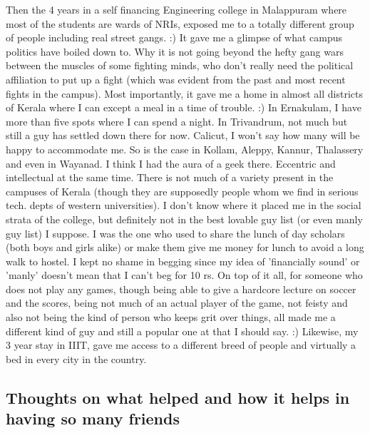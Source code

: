 Then the 4 years in a self financing Engineering college in Malappuram where most of the students 
are wards of NRIs, exposed me to a totally different group of people including real street gangs. :) 
It gave me a glimpse of what campus politics have boiled down to. Why it is not going beyond the hefty 
gang wars between the muscles of some fighting minds, who don't really need the political affiliation 
to put up a fight (which was evident from the past and most recent fights in the campus). Most importantly, 
it gave me a home in almost all districts of Kerala where I can except a meal in a time of trouble. :) 
In Ernakulam, I have more than five spots where I can spend a night. In Trivandrum, not much but still 
a guy has settled down there for now. Calicut, I won't say how many will be happy to accommodate me. So is the case in Kollam, Aleppy, Kannur, Thalassery and even in Wayanad. I think I had the aura of a geek there.
Eccentric and intellectual at the same time. There is not much of a variety present in the campuses of Kerala
(though they are supposedly people whom we find in serious tech. depts of western universities). I
don't know where it placed me in the social strata of the college, but definitely not in the best lovable guy 
list (or even manly guy list) I suppose. I was the one who used to share the lunch of day
scholars (both boys and girls alike) or make them give me money for lunch to avoid a long walk to
hostel. I kept no shame in begging since my idea of 'financially sound' or 'manly' doesn't mean that I can't 
beg for 10 rs. On top of it all, for someone who does not play any games, though being able to give a hardcore lecture on soccer 
and the scores, being not much of an actual player of the game, not feisty and also not being the kind of person who keeps grit 
over things, all made me a different kind of guy and still a popular one at that I should say. :) Likewise, 
my 3 year stay in IIIT, gave me access to a different breed of people and virtually a bed in every 
city in the country.

\subsection*{Thoughts on what helped and how it helps in having so many friends}

